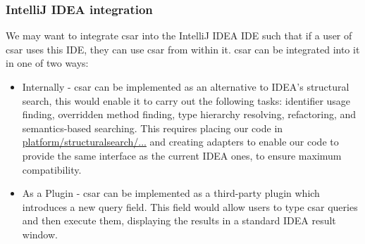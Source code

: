 \documentclass[12pt, letterpaper]{article}
\begin{document}
\subsubsection{IntelliJ IDEA integration}
We may want to integrate csar into the IntelliJ IDEA IDE such that if a user of csar uses this IDE, they can use csar from within it. 
csar can be integrated into it in one of two ways:
\begin{itemize}
  \item Internally - csar can be implemented as an alternative to IDEA's structural search,
  this would enable it to carry out the following tasks:
  identifier usage finding, overridden method finding, type hierarchy resolving, refactoring, and semantics-based searching.
  This requires placing our code in \href{https://github.com/JetBrains/intellij-community/tree/master/platform/structuralsearch/source/com/intellij/structuralsearch}{platform/structuralsearch/...} and creating adapters to enable our code to provide the same interface as the current IDEA ones, to ensure maximum compatibility.
  \item As a Plugin - csar can be implemented as a third-party plugin which introduces a new query field.
  This field would allow users to type csar queries and then execute them, displaying the results in a standard IDEA result window.
\end{itemize}
\end{document}
